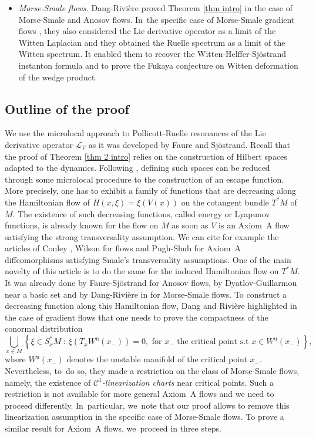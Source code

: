 \documentclass[11pt]{article}
\newcommand{\ru}{\mathrm{u}}
\theoremstyle{definition}
\theoremstyle{plain}
\newcommand{\Ccal}{\mathcal{C}}
\newcommand{\Lie}{\mathcal{L}}
\begin{document}
\begin{itemize}
\item \emph{Morse-Smale flows.} Dang-Rivière \cite{DRIII} proved Theorem \ref{thm intro} in the case of Morse-Smale and Anosov flows. In~the specific case of Morse-Smale gradient flows \cite{DR_witten}, they also considered the Lie derivative operator as a limit of the Witten Laplacian and they obtained the Ruelle spectrum as a limit of the Witten spectrum. It enabled them to recover the Witten-Helffer-Sjöstrand instanton formula and to prove the Fukaya conjecture on Witten deformation of the wedge product.
\end{itemize}

\subsection{Outline of the proof} We use the microlocal approach to Pollicott-Ruelle resonances of the Lie derivative operator $\Lie_V$ as it was developed by Faure and Sjöstrand. Recall that the proof of Theorem \ref{thm 2 intro} relies on the construction of Hilbert spaces adapted to the dynamics. Following \cite{FS}, defining such spaces can be reduced through some microlocal procedure to the construction of an escape function. More precisely, one has to exhibit a family of functions that are decreasing along the Hamiltonian flow of $H(x,\xi)= \xi(V(x))$ on the cotangent bundle $T^*M$ of $M$. The existence of such decreasing functions, called energy or Lyapunov functions, is already known for the flow on $M$ as soon as $V$ is an Axiom~A flow satisfying the strong transversality assumption. We can cite for example the articles of Conley \cite{conley}, Wilson \cite{wilson} for flows and Pugh-Shub \cite{pugh-shub} for Axiom~A diffeomorphisms satisfying Smale's transversality assumptions. One of the main novelty of this article is to do the same for the induced Hamiltonian flow on $T^*M$. It was already done by Faure-Sjöstrand \cite{FS} for Anosov flows, by Dyatlov-Guillarmou \cite{dyatlov-guillarmou_2016} near a basic set and by Dang-Rivière in \cite{DR0,DRI} for Morse-Smale flows. To construct a decreasing function along this Hamiltonian flow, Dang and Rivière highlighted in the case of gradient flows \cite{DR0} that one needs to prove the compactness of the conormal distribution\enlargethispage{.5\baselineskip}
\[
\bigcup_{x \in M} \left\{ \xi \in S_x^* M \:: \: \xi (T_x W^\ru (x_{-})) = 0, \text{ for } x_- \text{ the critical point s.t } x \in W^\ru (x_{-}) \right\},
\]
where $W^\ru (x_-)$ denotes the unstable manifold of the critical point $x_-$. Nevertheless, to~do so, they made a restriction on the class of Morse-Smale flows, namely, the existence of $\Ccal^1$\textit{-linearization charts} near critical points. Such a restriction is not available for more general Axiom~A flows and we need to proceed differently. In~particular, we~note that our proof allows to remove this linearization assumption in the specific case of Morse-Smale flows. To prove a similar result for Axiom~A flows, we~proceed in three steps.
\end{document}
